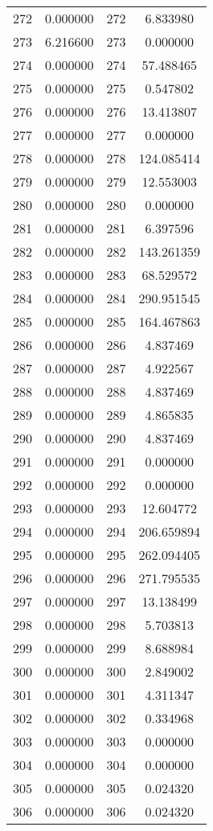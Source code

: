 \documentclass[12pt]{article}
\begin{document}
\begin{longtable}{@{}cccc@{}}
272 & 0.000000 & 272 & 6.833980 \\
273 & 6.216600 & 273 & 0.000000 \\
274 & 0.000000 & 274 & 57.488465 \\
275 & 0.000000 & 275 & 0.547802 \\
276 & 0.000000 & 276 & 13.413807 \\
277 & 0.000000 & 277 & 0.000000 \\
278 & 0.000000 & 278 & 124.085414 \\
279 & 0.000000 & 279 & 12.553003 \\
280 & 0.000000 & 280 & 0.000000 \\
281 & 0.000000 & 281 & 6.397596 \\
282 & 0.000000 & 282 & 143.261359 \\
283 & 0.000000 & 283 & 68.529572 \\
284 & 0.000000 & 284 & 290.951545 \\
285 & 0.000000 & 285 & 164.467863 \\
286 & 0.000000 & 286 & 4.837469 \\
287 & 0.000000 & 287 & 4.922567 \\
288 & 0.000000 & 288 & 4.837469 \\
289 & 0.000000 & 289 & 4.865835 \\
290 & 0.000000 & 290 & 4.837469 \\
291 & 0.000000 & 291 & 0.000000 \\
292 & 0.000000 & 292 & 0.000000 \\
293 & 0.000000 & 293 & 12.604772 \\
294 & 0.000000 & 294 & 206.659894 \\
295 & 0.000000 & 295 & 262.094405 \\
296 & 0.000000 & 296 & 271.795535 \\
297 & 0.000000 & 297 & 13.138499 \\
298 & 0.000000 & 298 & 5.703813 \\
299 & 0.000000 & 299 & 8.688984 \\
300 & 0.000000 & 300 & 2.849002 \\
301 & 0.000000 & 301 & 4.311347 \\
302 & 0.000000 & 302 & 0.334968 \\
303 & 0.000000 & 303 & 0.000000 \\
304 & 0.000000 & 304 & 0.000000 \\
305 & 0.000000 & 305 & 0.024320 \\
306 & 0.000000 & 306 & 0.024320 \\

\end{longtable}
\end{document}
